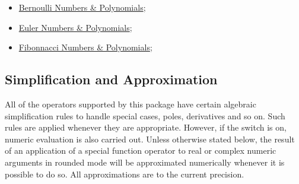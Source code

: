 \begin{itemize}
\item \hyperlink{operator:BERNOULLIP}{Bernoulli Numbers \& Polynomials};
\item \hyperlink{operator:EULERP}{Euler  Numbers \& Polynomials};
\item \hyperlink{operator:FIBONACCIP}{Fibonnacci  Numbers \& Polynomials};
\end{itemize}

\subsection{Simplification and Approximation}

All of the operators supported by this package have certain algebraic
simplification rules to handle special cases, poles, derivatives and so
on.  Such rules are applied whenever they are appropriate.  However, if
the  switch is on, numeric evaluation is also carried out.
Unless otherwise stated below, the result of an application of a special
function operator to real or complex numeric arguments in rounded mode
will be approximated numerically whenever it is possible to do so.  All
approximations are to the current precision.

